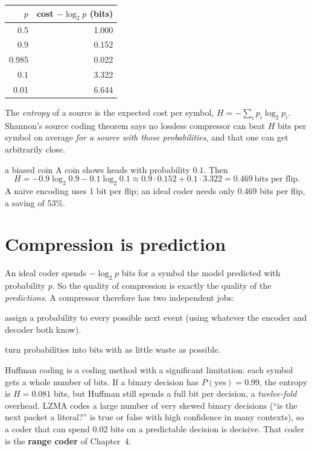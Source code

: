 \documentclass[11pt,a4paper,oneside]{book}
\begin{document}
\begin{center}
\begin{tabular}{rr}
\toprule
$p$ & cost $-\log_2 p$ (bits)\\
\midrule
0.5 & 1.000\\
0.9 & 0.152\\
0.985 & 0.022\\
0.1 & 3.322\\
0.01 & 6.644\\
\bottomrule
\end{tabular}
\end{center}

The \emph{entropy} of a source is the expected cost per symbol, $H=-\sum_i p_i\log_2 p_i$. Shannon's source coding theorem
says no lossless compressor can beat $H$ bits per symbol on average \emph{for a source with those probabilities}, and that
one can get arbitrarily close.

\begin{workedex}{a biased coin}
A coin shows heads with probability $0.1$. Then
\[
H = -0.9\log_2 0.9 - 0.1\log_2 0.1 \approx 0.9\cdot 0.152 + 0.1\cdot 3.322 = 0.469\ \text{bits per flip.}
\]
A naive encoding uses 1 bit per flip; an ideal coder needs only 0.469 bits per flip, a saving of 53\%.
\end{workedex}

\section{Compression is prediction}

An ideal coder spends $-\log_2 p$ bits for a symbol the model predicted with probability $p$. So the quality of
compression is exactly the quality of the \emph{predictions}. A compressor therefore has two independent jobs:

\begin{description}[leftmargin=2em]
\item[Modelling] assign a probability to every possible next event (using whatever the encoder and decoder both know).
\item[Coding] turn probabilities into bits with as little waste as possible.
\end{description}

Huffman coding is a coding method with a significant limitation: each symbol gets a whole number of bits.
If a binary decision has $P(\text{yes})=0.99$, the entropy is $H=0.081$ bits, but Huffman still spends a full bit per decision, a
\emph{twelve-fold} overhead. LZMA codes a large number of very skewed binary decisions (``is the next packet a literal?''
is true or false with high confidence in many contexts), so a coder that can spend 0.02 bits on a predictable decision
is decisive. That coder is the \textbf{range coder} of Chapter~4.
\end{document}
